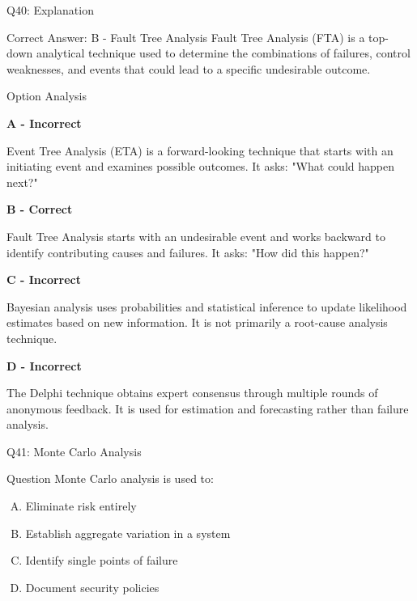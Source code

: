 \documentclass{beamer}
\begin{document}
	\begin{frame}[shrink=10]{Q40: Explanation}
		\footnotesize
		
		\begin{block}{Correct Answer: B - Fault Tree Analysis}
			Fault Tree Analysis (FTA) is a top-down analytical technique
			used to determine the combinations of failures, control
			weaknesses, and events that could lead to a specific
			undesirable outcome.
		\end{block}
		
		\begin{block}{Option Analysis}
			
			\textbf{A - Incorrect}
			
			Event Tree Analysis (ETA) is a forward-looking technique that
			starts with an initiating event and examines possible outcomes.
			It asks: "What could happen next?"
			
			\vspace{0.15cm}
			
			\textbf{B - Correct}
			
			Fault Tree Analysis starts with an undesirable event and works
			backward to identify contributing causes and failures. It asks:
			"How did this happen?"
			
			\vspace{0.15cm}
			
			\textbf{C - Incorrect}
			
			Bayesian analysis uses probabilities and statistical inference
			to update likelihood estimates based on new information. It is
			not primarily a root-cause analysis technique.
			
			\vspace{0.15cm}
			
			\textbf{D - Incorrect}
			
			The Delphi technique obtains expert consensus through multiple
			rounds of anonymous feedback. It is used for estimation and
			forecasting rather than failure analysis.
			
		\end{block}

	\end{frame}
	
	\begin{frame}{Q41: Monte Carlo Analysis}
		\begin{block}{Question}
			Monte Carlo analysis is used to:
		\end{block}
		\begin{enumerate}[(A)]
			\item Eliminate risk entirely
			\item Establish aggregate variation in a system
			\item Identify single points of failure
			\item Document security policies
		\end{enumerate}
	\end{frame}
	
\end{document}
